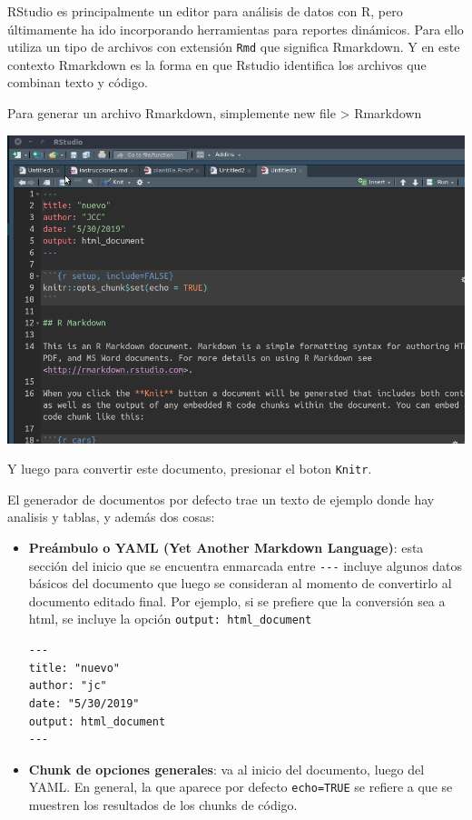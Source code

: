 \documentclass[
  11pt,
]{book}
\begin{document}
RStudio es principalmente un editor para análisis de datos con R, pero últimamente ha ido incorporando herramientas para reportes dinámicos. Para ello utiliza un tipo de archivos con extensión \texttt{Rmd} que significa Rmarkdown. Y en este contexto Rmarkdown es la forma en que Rstudio identifica los archivos que combinan texto y código.

Para generar un archivo Rmarkdown, simplemente new file \textgreater{} Rmarkdown

\includegraphics{images/rmarkdown.gif}

Y luego para convertir este documento, presionar el boton \texttt{Knitr}.

El generador de documentos por defecto trae un texto de ejemplo donde hay analisis y tablas, y además dos cosas:

\begin{itemize}
\item
  \textbf{Preámbulo o YAML (Yet Another Markdown Language)}: esta sección del inicio que se encuentra enmarcada entre \texttt{-\/-\/-} incluye algunos datos básicos del documento que luego se consideran al momento de convertirlo al documento editado final. Por ejemplo, si se prefiere que la conversión sea a html, se incluye la opción \texttt{output:\ html\_document}

\begin{verbatim}
---
title: "nuevo"
author: "jc"
date: "5/30/2019"
output: html_document
---
\end{verbatim}
\item
  \textbf{Chunk de opciones generales}: va al inicio del documento, luego del YAML. En general, la que aparece por defecto \texttt{echo=TRUE} se refiere a que se muestren los resultados de los chunks de código.
\end{itemize}
\end{document}
